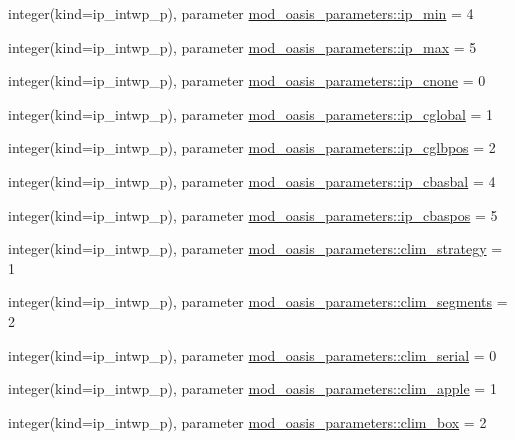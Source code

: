 \begin{DoxyCompactItemize}
\item 
integer(kind=ip\+\_\+intwp\+\_\+p), parameter \hyperlink{namespacemod__oasis__parameters_a194cfc3b7f2d515492e04fd6e8931c60}{mod\+\_\+oasis\+\_\+parameters\+::ip\+\_\+min} = 4
\item 
integer(kind=ip\+\_\+intwp\+\_\+p), parameter \hyperlink{namespacemod__oasis__parameters_abe7b7d586b50bd7c7d77c7834efa2801}{mod\+\_\+oasis\+\_\+parameters\+::ip\+\_\+max} = 5
\item 
integer(kind=ip\+\_\+intwp\+\_\+p), parameter \hyperlink{namespacemod__oasis__parameters_ae043e4e2c2b7f04fec7d8c061ef52934}{mod\+\_\+oasis\+\_\+parameters\+::ip\+\_\+cnone} = 0
\item 
integer(kind=ip\+\_\+intwp\+\_\+p), parameter \hyperlink{namespacemod__oasis__parameters_ae251e3ac1c9c82ae5db2a768d2d59d5f}{mod\+\_\+oasis\+\_\+parameters\+::ip\+\_\+cglobal} = 1
\item 
integer(kind=ip\+\_\+intwp\+\_\+p), parameter \hyperlink{namespacemod__oasis__parameters_aec700ad0c6a11dd35e5d6c2afb745fd0}{mod\+\_\+oasis\+\_\+parameters\+::ip\+\_\+cglbpos} = 2
\item 
integer(kind=ip\+\_\+intwp\+\_\+p), parameter \hyperlink{namespacemod__oasis__parameters_aaa7ead98ff7d53acfd539a32fca9e2c7}{mod\+\_\+oasis\+\_\+parameters\+::ip\+\_\+cbasbal} = 4
\item 
integer(kind=ip\+\_\+intwp\+\_\+p), parameter \hyperlink{namespacemod__oasis__parameters_a3b96d31bbe142d84df2b93880498936f}{mod\+\_\+oasis\+\_\+parameters\+::ip\+\_\+cbaspos} = 5
\item 
integer(kind=ip\+\_\+intwp\+\_\+p), parameter \hyperlink{namespacemod__oasis__parameters_a611cae6f3c65a75f26e76b2f88f34037}{mod\+\_\+oasis\+\_\+parameters\+::clim\+\_\+strategy} = 1
\item 
integer(kind=ip\+\_\+intwp\+\_\+p), parameter \hyperlink{namespacemod__oasis__parameters_a7427036a6530871a0f49c0fb75f2b3ef}{mod\+\_\+oasis\+\_\+parameters\+::clim\+\_\+segments} = 2
\item 
integer(kind=ip\+\_\+intwp\+\_\+p), parameter \hyperlink{namespacemod__oasis__parameters_a5c410369e763f9156d0ce1c82e866265}{mod\+\_\+oasis\+\_\+parameters\+::clim\+\_\+serial} = 0
\item 
integer(kind=ip\+\_\+intwp\+\_\+p), parameter \hyperlink{namespacemod__oasis__parameters_a3cfd98fdd1c2fac653b182454c87f4aa}{mod\+\_\+oasis\+\_\+parameters\+::clim\+\_\+apple} = 1
\item 
integer(kind=ip\+\_\+intwp\+\_\+p), parameter \hyperlink{namespacemod__oasis__parameters_a9a8b38629274e3a38a37f329ce9d2aa2}{mod\+\_\+oasis\+\_\+parameters\+::clim\+\_\+box} = 2

\end{DoxyCompactItemize}
